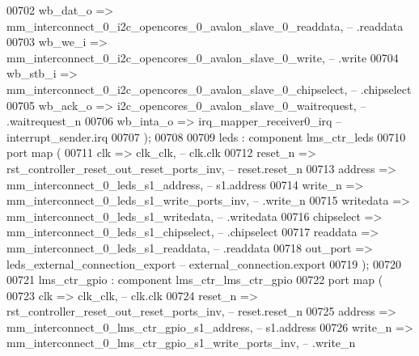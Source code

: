 \begin{DoxyCode}
00702             wb\_dat\_o   => 
      mm_interconnect_0_i2c_opencores_0_avalon_slave_0_readdata,\textcolor{keyword}{   --                 .readdata}
00703             wb\_we\_i    => mm_interconnect_0_i2c_opencores_0_avalon_slave_0_write,\textcolor{keyword}{      --                
       .write}
00704             wb\_stb\_i   => 
      mm_interconnect_0_i2c_opencores_0_avalon_slave_0_chipselect,\textcolor{keyword}{ --                 .chipselect}
00705             wb\_ack\_o   => i2c_opencores_0_avalon_slave_0_waitrequest,\textcolor{keyword}{                  --                
       .waitrequest\_n}
00706             wb\_inta\_o  => irq_mapper_receiver0_irq                                     \textcolor{keyword}{--
       interrupt\_sender.irq}
00707         \textcolor{vhdlchar}{)};
00708 
00709     leds : \textcolor{keywordflow}{component} lms\_ctr\_leds
00710         \textcolor{keywordflow}{port} \textcolor{keywordflow}{map} (
00711             clk        => clk_clk,\textcolor{keyword}{                                   --                 clk.clk}
00712             reset\_n    => rst_controller_reset_out_reset_ports_inv,\textcolor{keyword}{  --               reset.reset\_n}
00713             address    => mm_interconnect_0_leds_s1_address,\textcolor{keyword}{         --                  s1.address}
00714             write\_n    => mm_interconnect_0_leds_s1_write_ports_inv,\textcolor{keyword}{ --                    .write\_n}
00715             writedata  => mm_interconnect_0_leds_s1_writedata,\textcolor{keyword}{       --                    .writedata}
00716             chipselect => mm_interconnect_0_leds_s1_chipselect,\textcolor{keyword}{      --                    .chipselect}
00717             readdata   => mm_interconnect_0_leds_s1_readdata,\textcolor{keyword}{        --                    .readdata}
00718             out\_port   => leds_external_connection_export            \textcolor{keyword}{-- external\_connection.export}
00719         \textcolor{vhdlchar}{)};
00720 
00721     lms_ctr_gpio : \textcolor{keywordflow}{component} lms\_ctr\_lms\_ctr\_gpio
00722         \textcolor{keywordflow}{port} \textcolor{keywordflow}{map} (
00723             clk        => clk_clk,\textcolor{keyword}{                                           --                 clk.clk}
00724             reset\_n    => rst_controller_reset_out_reset_ports_inv,\textcolor{keyword}{          --               reset.reset\_n}
00725             address    => mm_interconnect_0_lms_ctr_gpio_s1_address,\textcolor{keyword}{         --                  s1.address}
00726             write\_n    => mm_interconnect_0_lms_ctr_gpio_s1_write_ports_inv,\textcolor{keyword}{ --                    .write\_n}

\end{DoxyCode}
